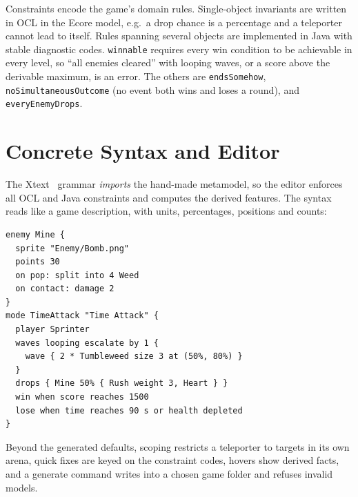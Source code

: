 \documentclass[conference]{IEEEtran}
\begin{document}
Constraints encode the game's domain rules. Single-object invariants are written in OCL in the Ecore
model, e.g.\ a drop chance is a percentage and a teleporter cannot lead to itself. Rules spanning
several objects are implemented in Java with stable diagnostic codes. \texttt{winnable} requires
every win condition to be achievable in every level, so ``all enemies cleared'' with looping waves,
or a score above the derivable maximum, is an error. The others are \texttt{endsSomehow},
\texttt{noSimultaneousOutcome} (no event both wins and loses a round), and \texttt{everyEnemyDrops}.

\section{Concrete Syntax and Editor}
The Xtext~\cite{xtext} grammar \emph{imports} the hand-made metamodel, so the editor enforces all
OCL and Java constraints and computes the derived features. The syntax reads like a game
description, with units, percentages, positions and counts:

\begin{lstlisting}
enemy Mine {
  sprite "Enemy/Bomb.png"
  points 30
  on pop: split into 4 Weed
  on contact: damage 2
}
mode TimeAttack "Time Attack" {
  player Sprinter
  waves looping escalate by 1 {
    wave { 2 * Tumbleweed size 3 at (50%, 80%) }
  }
  drops { Mine 50% { Rush weight 3, Heart } }
  win when score reaches 1500
  lose when time reaches 90 s or health depleted
}
\end{lstlisting}

Beyond the generated defaults, scoping restricts a teleporter to targets in its own arena, quick
fixes are keyed on the constraint codes, hovers show derived facts, and a generate command writes
into a chosen game folder and refuses invalid models.
\end{document}
